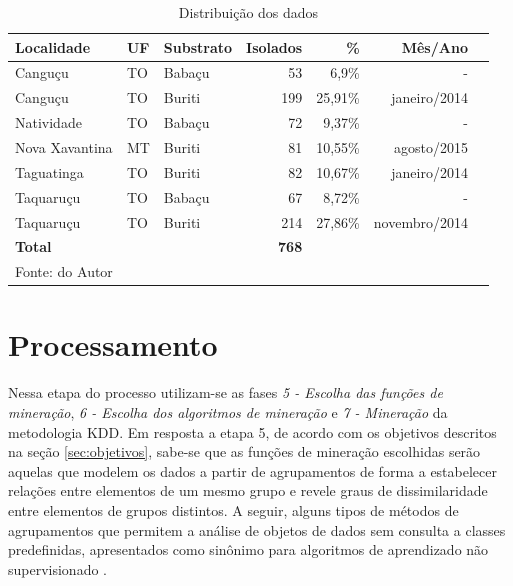 \documentclass[tcc2]{classe_uftex/uftex}
\begin{document}
    \begin{table}%
    \centering
    \caption{\label{tab:tabela01} Distribuição dos dados}
    \begin{tabular}[c]{lllrrrr}
    \hline
     \textbf{Localidade} & \textbf{UF} & \textbf{Substrato} & \textbf{Isolados} & \textbf{\%} & \textbf{Mês/Ano}\\
     \hline
    Canguçu	& TO & Babaçu & 53 & 6,9\% & - \\
    Canguçu	& TO & Buriti & 199 & 25,91\% & janeiro/2014\\
    Natividade & TO & Babaçu & 72 & 9,37\% & - \\
    Nova Xavantina & MT & Buriti & 81 & 10,55\% & agosto/2015\\
    Taguatinga & TO & Buriti & 82 & 10,67\% & janeiro/2014\\
    Taquaruçu & TO & Babaçu & 67 & 8,72\% & - \\
    Taquaruçu & TO & Buriti & 214 & 27,86\% & novembro/2014\\
      \hline
      \textbf{Total} & & & \textbf{768} \\
    \raggedright \scriptsize \centering Fonte: do Autor
    \end{tabular}
    \end{table}
    

\section{Processamento}
\label{sec:processamento}
Nessa etapa do processo utilizam-se as fases \emph{5 - Escolha das funções de mineração}, \emph{6 - Escolha dos algoritmos de mineração} e \emph{7 - Mineração} da metodologia KDD. Em resposta a etapa 5, de acordo com os objetivos descritos na seção \ref{sec:objetivos}, sabe-se que as funções de mineração escolhidas serão aquelas que modelem os dados a partir de agrupamentos de forma a estabelecer relações entre elementos de um mesmo grupo e revele graus de dissimilaridade entre elementos de grupos distintos. A seguir, alguns tipos de métodos de agrupamentos que permitem a análise de objetos de dados sem consulta a classes predefinidas, apresentados como sinônimo para algoritmos de aprendizado não supervisionado \cite{2012:Han}.
    
\end{document}
